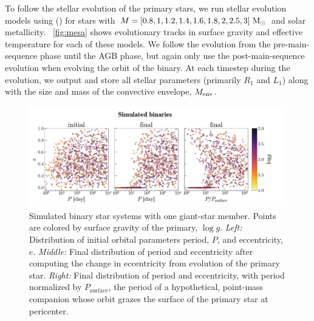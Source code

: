 \documentclass[modern, letterpaper]{aastex62}
\newcommand{\logg}{\ensuremath{\log g}}
\newcommand{\Psurf}{\ensuremath{P_\textrm{surface}}}
\begin{document}
To follow the stellar evolution of the primary stars, we run stellar evolution
models using  (\citealt{Paxton:2011}) for stars with $M = [0.8, 1,
1.2, 1.4, 1.6, 1.8, 2, 2.5, 3]~\mathrm{M}_\odot$ and solar metallicity.
\figurename~\ref{fig:mesa} shows evolutionary tracks in surface gravity and
effective temperature for each of these models.
We follow the evolution from the pre-main-sequence phase until the AGB phase,
but again only use the post-main-sequence evolution when evolving the orbit of
the binary.
At each timestep during the evolution, we output and store all stellar parameters (primarily $R_1$ and $L_1$) along with the size and mass of the convective envelope, $M_{\rm env}$.

\begin{figure}[htbp]
\begin{center}
\includegraphics[trim={0 0 1cm 0}, clip, width=\linewidth]{simulated}
\end{center}
\caption{%
Simulated binary star systems with one giant-star member.
Points are colored by surface gravity of the primary, \logg.
\textit{Left:} Distribution of initial orbital parameters period, $P$, and
eccentricity, $e$.
\textit{Middle:} Final distribution of period and eccentricity after computing
the change in eccentricity from evolution of the primary star.
\textit{Right:} Final distribution of period and eccentricity, with period
normalized by \Psurf, the period of a hypothetical, point-mass
companion whose orbit grazes the surface of the primary star at pericenter.
\label{fig:simulated}
}
\end{figure}
\end{document}

